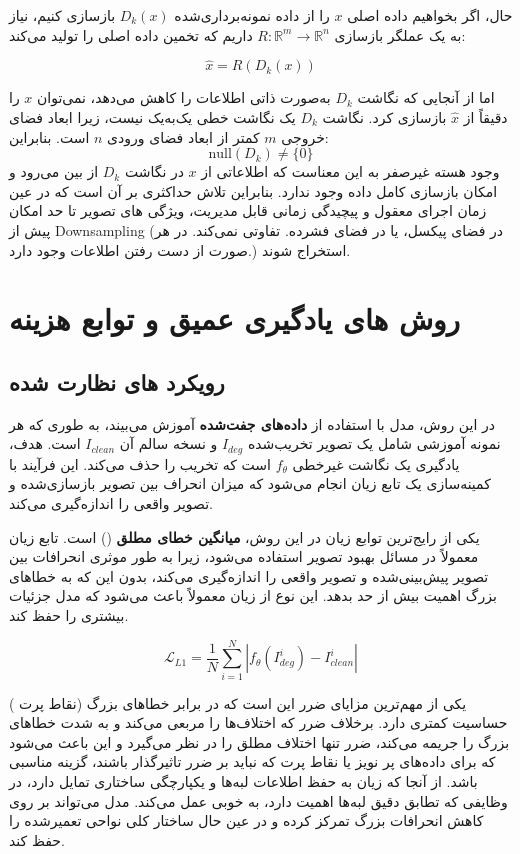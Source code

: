 حال، اگر بخواهیم داده اصلی \( x \) را از داده نمونه‌برداری‌شده \( D_k(x) \) بازسازی کنیم، نیاز به یک عملگر بازسازی \( R: \mathbb{R}^m \to \mathbb{R}^n \) داریم که تخمین داده اصلی را تولید می‌کند:

\[
\hat{x} = R(D_k(x))
\]

اما از آنجایی که نگاشت \( D_k \) به‌صورت ذاتی اطلاعات را کاهش می‌دهد، نمی‌توان \( x \) را دقیقاً از \( \hat{x} \) بازسازی کرد. نگاشت \( D_k \) یک نگاشت خطی یک‌به‌یک نیست، زیرا ابعاد فضای خروجی \( m \) کمتر از ابعاد فضای ورودی \( n \) است. بنابراین:
\[
\text{null}(D_k) \neq \{0\}
\]
وجود هسته غیرصفر به این معناست که اطلاعاتی از \( x \) در نگاشت \( D_k \) از بین می‌رود و امکان بازسازی کامل داده وجود ندارد. بنابراین تلاش حداکثری بر آن است که در عین زمان اجرای معقول و پیچیدگی زمانی قابل مدیریت، ویژگی های تصویر تا حد امکان پیش از Downsampling (در فضای پیکسل، یا در فضای فشرده. تفاوتی نمی‌کند. در هر صورت از دست رفتن اطلاعات وجود دارد.) استخراج شوند.





\section{روش های یادگیری عمیق و توابع هزینه}

\subsection{رویکرد های نظارت شده }

در این روش، مدل با استفاده از \textbf{داده‌های جفت‌شده} آموزش می‌بیند، به طوری که هر نمونه آموزشی شامل یک تصویر تخریب‌شده $ I_{deg} $ و نسخه سالم آن $ I_{clean} $  است. هدف، یادگیری یک نگاشت غیرخطی $ f_{\theta} $  است که تخریب را حذف می‌کند. این فرآیند با کمینه‌سازی یک تابع زیان انجام می‌شود
که میزان انحراف بین تصویر بازسازی‌شده و تصویر واقعی را اندازه‌گیری می‌کند.


یکی از رایج‌ترین توابع زیان در این روش، \textbf{میانگین خطای مطلق}
()
است. تابع زیان  معمولاً در مسائل بهبود تصویر استفاده می‌شود، زیرا به طور موثری انحرافات بین تصویر پیش‌بینی‌شده و تصویر واقعی را اندازه‌گیری می‌کند، بدون این که به خطاهای بزرگ اهمیت بیش از حد بدهد. این نوع از زیان معمولاً باعث می‌شود که مدل جزئیات بیشتری را حفظ کند.

$$
\mathcal{L}_{L1} = \frac{1}{N} \sum_{i=1}^{N} |f_{\theta}(I_{deg}^i) - I_{clean}^i|
$$ 

 یکی از مهم‌ترین مزایای ضرر  این است که در برابر خطاهای بزرگ (نقاط پرت
 )
حساسیت کمتری دارد. برخلاف ضرر  که اختلاف‌ها را مربعی می‌کند و به شدت خطاهای بزرگ را جریمه می‌کند، ضرر  تنها اختلاف مطلق را در نظر می‌گیرد و این باعث می‌شود که برای داده‌های پر نویز یا نقاط پرت که نباید بر ضرر تاثیرگذار باشند، گزینه مناسبی باشد. از آنجا که زیان  به حفظ اطلاعات لبه‌ها و یکپارچگی ساختاری تمایل دارد، در وظایفی که تطابق دقیق لبه‌ها اهمیت دارد، به خوبی عمل می‌کند. مدل می‌تواند بر روی کاهش انحرافات بزرگ تمرکز کرده و در عین حال ساختار کلی نواحی تعمیرشده را حفظ کند.

